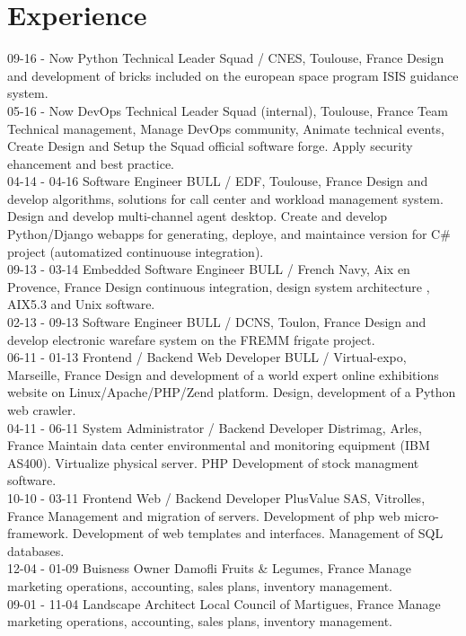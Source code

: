 \documentclass[]{friggeri-cv}
\begin{document}
\section{Experience}
\begin{entrylist}
  	\entry
    {09-16 - Now}
    {Python Technical Leader}
    {Squad / CNES, Toulouse, France}
    {Design and development of bricks included on the european space program ISIS guidance system.\\}
  	\entry
    {05-16 - Now}
    {DevOps Technical Leader}
    {Squad (internal), Toulouse, France}
    {Team Technical management, Manage DevOps community, Animate technical events, Create Design and Setup the Squad official software forge. Apply security ehancement and best practice.\\}
  	\entry
    {04-14 - 04-16}
    {Software Engineer}
    {BULL / EDF, Toulouse, France}
    {Design and develop algorithms, solutions for call center and workload management system. Design and develop multi-channel agent desktop.
    Create and develop Python/Django webapps for generating, deploye, and maintaince version for C\# project (automatized continuouse integration).\\}
  	\entry
    {09-13 - 03-14}
    {Embedded Software Engineer}
    {BULL / French Navy, Aix en Provence, France}
    {Design continuous integration, design system architecture , AIX5.3 and Unix software.\\}
    \entry
    {02-13 - 09-13}
    {Software Engineer}
    {BULL / DCNS, Toulon, France}
    {Design and develop electronic warefare system on the FREMM frigate project.\\}
    \entry
    {06-11 - 01-13}
    {Frontend / Backend Web Developer}
    {BULL / Virtual-expo, Marseille, France}
    {Design and development of a world expert online exhibitions website on Linux/Apache/PHP/Zend platform. Design, development of a Python web crawler.\\}
    \entry
    {04-11 - 06-11}
    {System Administrator / Backend Developer}
    {Distrimag, Arles, France}
    {Maintain data center environmental and monitoring equipment (IBM AS400). Virtualize physical server. PHP Development of stock managment software.\\}
    \entry
    {10-10 - 03-11}
    {Frontend Web / Backend Developer}
    {PlusValue SAS, Vitrolles, France}
    {Management and migration of servers. Development of php web micro-framework. Development of web templates and interfaces. Management of SQL databases.\\}
    \entry
    {12-04 - 01-09}
    {Buisness Owner}
    {Damofli Fruits \& Legumes, France}
    {Manage marketing operations, accounting, sales plans, inventory management.\\}
    \entry
    {09-01 - 11-04}
    {Landscape Architect}
    {Local Council of Martigues, France}
    {Manage marketing operations, accounting, sales plans, inventory management.}
\end{entrylist}
\end{document}

